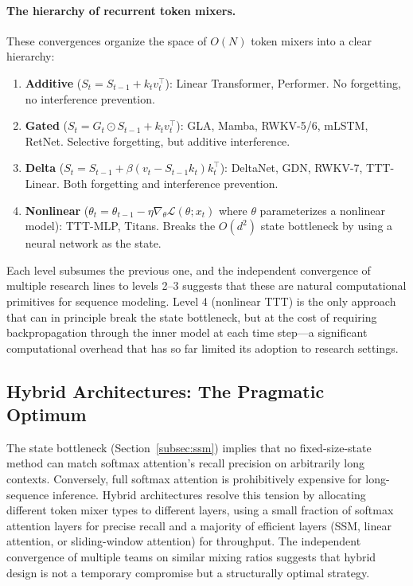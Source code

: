 \paragraph{The hierarchy of recurrent token mixers.}
These convergences organize the space of $O(N)$ token mixers into a clear hierarchy:
\begin{enumerate}[nosep]
\item \textbf{Additive} ($S_t = S_{t-1} + k_t v_t^\top$): Linear Transformer, Performer. No forgetting, no interference prevention.
\item \textbf{Gated} ($S_t = G_t \odot S_{t-1} + k_t v_t^\top$): GLA, Mamba, RWKV-5/6, mLSTM, RetNet. Selective forgetting, but additive interference.
\item \textbf{Delta} ($S_t = S_{t-1} + \beta(v_t - S_{t-1} k_t) k_t^\top$): DeltaNet, GDN, RWKV-7, TTT-Linear. Both forgetting and interference prevention.
\item \textbf{Nonlinear} ($\theta_t = \theta_{t-1} - \eta \nabla_\theta \mathcal{L}(\theta; x_t)$ where $\theta$ parameterizes a nonlinear model): TTT-MLP, Titans. Breaks the $O(d^2)$ state bottleneck by using a neural network as the state.
\end{enumerate}
Each level subsumes the previous one, and the independent convergence of multiple research lines to levels 2--3 suggests that these are natural computational primitives for sequence modeling. Level 4 (nonlinear TTT) is the only approach that can in principle break the state bottleneck, but at the cost of requiring backpropagation through the inner model at each time step---a significant computational overhead that has so far limited its adoption to research settings.



\subsection{Hybrid Architectures: The Pragmatic Optimum}
\label{subsec:hybrid}

The state bottleneck (Section~\ref{subsec:ssm}) implies that no fixed-size-state method can match softmax attention's recall precision on arbitrarily long contexts. Conversely, full softmax attention is prohibitively expensive for long-sequence inference. Hybrid architectures resolve this tension by allocating different token mixer types to different layers, using a small fraction of softmax attention layers for precise recall and a majority of efficient layers (SSM, linear attention, or sliding-window attention) for throughput. The independent convergence of multiple teams on similar mixing ratios suggests that hybrid design is not a temporary compromise but a structurally optimal strategy.

